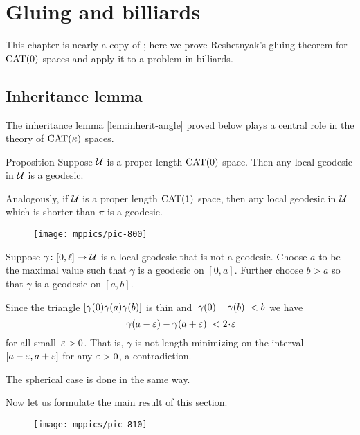 \chapter{Gluing and billiards}\label{chapter:gluing}

This chapter is nearly a copy of \cite[Chapter 2]{alexander-kapovitch-petrunin-2019};
here we prove Reshetnyak's gluing theorem for $\mathrm{CAT}(0)$ spaces and apply it to a problem in billiards.


\section{Inheritance lemma} \label{sec:thin-triangle}

The inheritance lemma \ref{lem:inherit-angle} proved below plays a central role in the theory of $\mathrm{CAT}(\kappa)$ spaces.

\medskip

\begin{thm}{Proposition}\label{cor:loc-geod-are-min}
Suppose $\mathcal{U}$ is a proper length $\mathrm{CAT}(0)$ space.  
Then any local geodesic in $\mathcal{U}$ is a geodesic.

Analogously, if $\mathcal{U}$ is a proper length $\mathrm{CAT}(1)$ space, then any local geodesic in $\mathcal{U}$ which is shorter than $\pi$ is a geodesic.
\end{thm}


\begin{wrapfigure}{r}{25mm}
\vskip-0mm
\centering
\texttt{[image: mppics/pic-800]}
\end{wrapfigure}

Suppose $\gamma\colon[0,\ell]\to\mathcal{U}$ is a local geodesic that is not a geodesic.
Choose $a$ to be the maximal value 
such that $\gamma$ is a geodesic on $[0,a]$.
Further choose $b>a$ so that $\gamma$ is a geodesic on $[a,b]$.

Since the triangle $[\gamma(0)\gamma(a)\gamma(b)]$ is thin and 
$\dist{\gamma(0)}{\gamma(b)}{}<b$ we have
\[\dist{\gamma(a-\eps)}{\gamma(a+\eps)}{}<2\cdot\eps\]
for all small~$\varepsilon>0$.
That is, $\gamma$ is not length-minimizing on the interval $[a-\varepsilon,a+\varepsilon]$ for any $\varepsilon>0$,
a contradiction.

The spherical case is done in the same way.
\qeds

Now let us formulate the main result of this section.

\begin{wrapfigure}{r}{25mm}
\vskip-0mm
\centering
\texttt{[image: mppics/pic-810]}
\end{wrapfigure}

